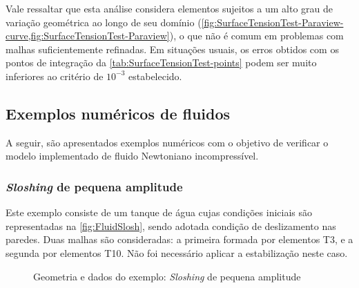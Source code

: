 \documentclass[Tese.tex]{subfiles}
\begin{document}
Vale ressaltar que esta análise considera elementos sujeitos a um alto grau de variação geométrica ao longo de seu domínio (\cref{fig:SurfaceTensionTest-Paraview-curve,fig:SurfaceTensionTest-Paraview}), o que não é comum em problemas com malhas suficientemente refinadas. Em situações usuais, os erros obtidos com os pontos de integração da \cref{tab:SurfaceTensionTest-points} podem ser muito inferiores ao critério de $10^{-3}$ estabelecido.

\subsection{Exemplos numéricos de fluidos}

A seguir, são apresentados exemplos numéricos com o objetivo de verificar o modelo implementado de fluido Newtoniano incompressível.

\subsubsection{\emph{Sloshing} de pequena amplitude}

Este exemplo consiste de um tanque de água cujas condições iniciais são representadas na \autoref{fig:FluidSlosh}, sendo adotada condição de deslizamento nas paredes. Duas malhas são consideradas: a primeira formada por elementos T3, e a segunda por elementos T10. Não foi necessário aplicar a estabilização neste caso.

\begin{figure}[!htb]
	\centering
	\caption{Geometria e dados do exemplo: \emph{Sloshing} de pequena amplitude}
	\label{fig:FluidSlosh}
	{\small
		\noindent{}
	}	
\end{figure}
\end{document}
